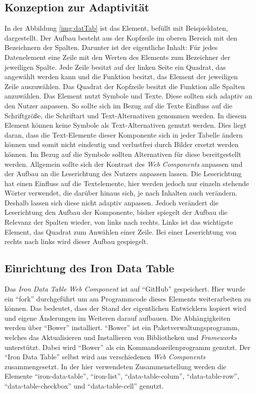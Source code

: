 \documentclass[12pt, paper=a4, bibtotoc, toc=listof, headsepline=true, numbers=endperiod]{scrreprt}
\begin{document}
	\subsection{Konzeption zur Adaptivität}
	\label{sec:konZurAda}
	In der Abbildung \ref{img:datTab} ist das Element, befüllt mit Beispieldaten, dargestellt. Der Aufbau besteht aus der Kopfzeile im oberen Bereich mit den Bezeichnern der Spalten. Darunter ist der eigentliche Inhalt: Für jedes Datenelement eine Zeile mit den Werten des Elements zum Bezeichner der jeweiligen Spalte. Jede Zeile besitzt auf der linken Seite ein Quadrat, das angewählt werden kann und die Funktion besitzt, das Element der jeweiligen Zeile auszuwählen. Das Quadrat der Kopfzeile besitzt die Funktion alle Spalten anzuwählen.
	\newline
	Das Element nutzt Symbole und Texte. Diese sollten sich adaptiv an den Nutzer anpassen. So sollte sich im Bezug auf die Texte Einfluss auf die Schriftgröße, die Schriftart und Text-Alternativen genommen werden. In diesem Element können keine Symbole als Text-Alternativen genutzt werden. Dies liegt daran, dass die Text-Elemente dieser Komponente sich in jeder Tabelle ändern können und somit nicht eindeutig und verlustfrei durch Bilder ersetzt werden können. Im Bezug auf die Symbole sollten Alternativen für diese bereitgestellt werden. Allgemein sollte sich der Kontrast des \emph{Web Components} anpassen und der Aufbau an die Leserichtung des Nutzers anpassen lassen. Die Leserichtung hat einen Einfluss auf die Textelemente, hier werden jedoch nur einzeln stehende Wörter verwendet, die darüber hinaus sich, je nach Inhalten auch verändern. Deshalb lassen sich diese nicht adaptiv anpassen. Jedoch verändert die Leserichtung den Aufbau der Komponente, bisher spiegelt der Aufbau die Relevanz der Spalten wieder, von links nach rechts. Links ist das wichtigste Element, das Quadrat zum Anwählen einer Zeile. Bei einer Leserichtung von rechts nach links wird dieser Aufbau gespiegelt.  
	\subsection{Einrichtung des Iron Data Table}
	Das \emph{Iron Data Table Web Component} ist auf \enquote{GitHub} gespeichert. Hier wurde ein \enquote{fork} durchgeführt um am Programmcode dieses Elements weiterarbeiten zu können. Das bedeutet, dass der Stand der eigentlichen Entwicklern kopiert wird und eigene Änderungen im Weiteren darauf aufbauen. Die Abhängigkeiten werden über \enquote{Bower} installiert. \enquote{Bower} ist ein Paketverwaltungsprogramm, welches das Aktualisieren und Installieren von Bibliotheken und \emph{Frameworks} unterstützt. Dabei wird \enquote{Bower} als ein Kommandozeilenprogramm genutzt\cite{bower}. Der \enquote{Iron Data Table} selbst wird aus verschiedenen \emph{Web Components} zusammengesetzt. In der hier verwendeten Zusammenstellung werden die Elemente \enquote{iron-data-table}, \enquote{iron-list}, \enquote{data-table-colum}, \enquote{data-table-row}, \enquote{data-table-checkbox} und \enquote{data-table-cell}  genutzt.  
\end{document}

